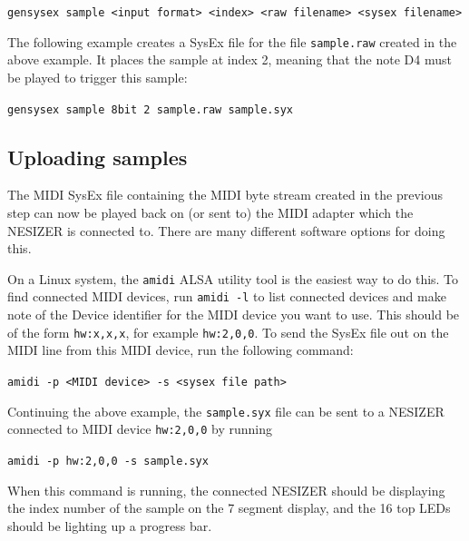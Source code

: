 \documentclass[a4paper, 12p]{extarticle}
\begin{document}
\verb+gensysex sample <input format> <index> <raw filename> <sysex filename>+

The following example creates a SysEx file for the file \verb+sample.raw+ created in the above example. It places the sample at index 2, meaning that the note D4 must be played to trigger this sample:

\verb+gensysex sample 8bit 2 sample.raw sample.syx+

\subsection{Uploading samples}
The MIDI SysEx file containing the MIDI byte stream created in the previous step can now be played back on (or sent to) the MIDI adapter which the NESIZER is connected to. There are many different software options for doing this.

On a Linux system, the \verb+amidi+ ALSA utility tool is the easiest way to do this. To find connected MIDI devices, run \verb+amidi -l+ to list connected devices and make note of the Device identifier for the MIDI device you want to use. This should be of the form \verb+hw:x,x,x+, for example \verb+hw:2,0,0+.
To send the SysEx file out on the MIDI line from this MIDI device, run the following command:

\verb+amidi -p <MIDI device> -s <sysex file path>+

Continuing the above example, the \verb+sample.syx+ file can be sent to a NESIZER connected to MIDI device \verb+hw:2,0,0+ by running

\verb+amidi -p hw:2,0,0 -s sample.syx+

When this command is running, the connected NESIZER should be displaying the index number of the sample on the 7 segment display, and the 16 top LEDs should be lighting up a progress bar.
\end{document}
